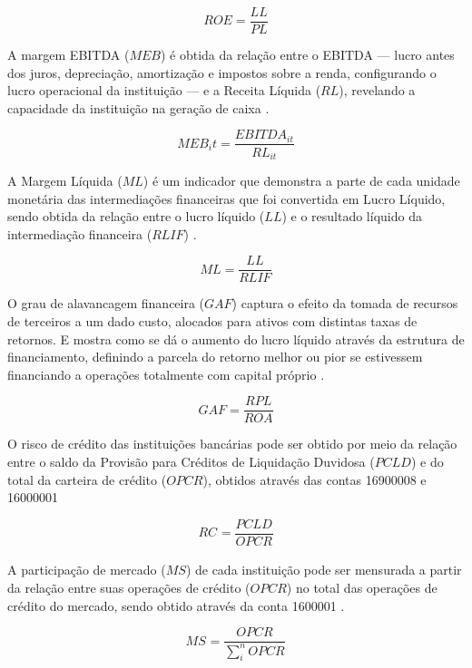 \documentclass[
  12pt,
  12pt,
  openright,
  oneside,
  a4paper,
  chapter=TITLE,
  section=TITLE,
  subsection=TITLE,
  subsubsection=TITLE,
  english,
  portugues,
  sumario=tradicional]{abntex2}
\begin{document}
\begin{equation}
ROE = \frac{LL}{PL}
\end{equation}

A margem EBITDA (\(MEB\)) é obtida da relação entre o EBITDA --- lucro antes dos juros, depreciação, amortização e impostos sobre a renda, configurando o lucro operacional da instituição --- e a Receita Líquida (\(RL\)), revelando a capacidade da instituição na geração de caixa \cite{assaf:2020}.

\begin{equation}
MEB_it = \frac{EBITDA_{it}}{RL_{it}}
\end{equation}

A Margem Líquida (\(ML\)) é um indicador que demonstra a parte de cada unidade monetária das intermediações financeiras que foi convertida em Lucro Líquido, sendo obtida da relação entre o lucro líquido (\(LL\)) e o resultado líquido da intermediação financeira (\(RLIF\)) \cite{assaf:2020}.

\begin{equation}
ML = \frac{LL}{RLIF}
\end{equation}

O grau de alavancagem financeira (\(GAF\)) captura o efeito da tomada de recursos de terceiros a um dado custo, alocados para ativos com distintas taxas de retornos. E mostra como se dá o aumento do lucro líquido através da estrutura de financiamento, definindo a parcela do retorno melhor ou pior se estivessem financiando a operações totalmente com capital próprio \cite{assaf:2020}.

\begin{equation}
GAF = \frac{RPL}{ROA}
\end{equation}

O risco de crédito das instituições bancárias pode ser obtido por meio da relação entre o saldo da Provisão para Créditos de Liquidação Duvidosa (\(PCLD\)) e do total da carteira de crédito (\(OPCR\)), obtidos através das contas 16900008 e 16000001 \cite{dantas:2012}

\begin{equation}
RC_{} = \frac{PCLD_{}}{OPCR_{}}
\end{equation}

A participação de mercado (\(MS\)) de cada instituição pode ser mensurada a partir da relação entre suas operações de crédito (\(OPCR\)) no total das operações de crédito do mercado, sendo obtido através da conta 1600001 \cite{dantas:2012}.

\begin{equation}
MS_{} = \frac{OPCR_{}}{\sum_{i}^{n}OPCR_{}} 
\end{equation}
\end{document}
